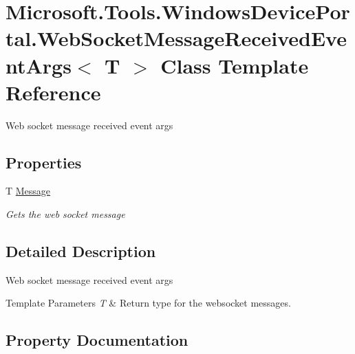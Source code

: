 \hypertarget{class_microsoft_1_1_tools_1_1_windows_device_portal_1_1_web_socket_message_received_event_args}{}\section{Microsoft.\+Tools.\+Windows\+Device\+Portal.\+Web\+Socket\+Message\+Received\+Event\+Args$<$ T $>$ Class Template Reference}
\label{class_microsoft_1_1_tools_1_1_windows_device_portal_1_1_web_socket_message_received_event_args}


Web socket message received event args  


\subsection*{Properties}
\begin{DoxyCompactItemize}
\item 
T \hyperlink{class_microsoft_1_1_tools_1_1_windows_device_portal_1_1_web_socket_message_received_event_args_a6121cde3bf372903643917305072893b}{Message}
\begin{DoxyCompactList}\small\item\em Gets the web socket message \end{DoxyCompactList}\end{DoxyCompactItemize}


\subsection{Detailed Description}
Web socket message received event args 


\begin{DoxyTemplParams}{Template Parameters}
{\em T} & Return type for the websocket messages.\\
\hline
\end{DoxyTemplParams}


\subsection{Property Documentation}
